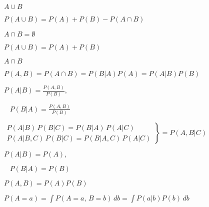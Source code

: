 \documentclass{article}
\def\lthtmlcheckvsize{\ifdim\ht\sizebox<\vsize 
  \ifdim\wd\sizebox<\hsize\expandafter\hfill\fi \expandafter\vfill
  \else\expandafter\vss\fi}%
\begin{document}
{\newpage\clearpage
{}%
$ A\cup B$%
\lthtmlindisplaymathZ
\lthtmlcheckvsize\clearpage}

{\newpage\clearpage
{}%
$\displaystyle P(A\cup B)=P(A)+P(B)-P(A\cap B)$%
\lthtmlindisplaymathZ
\lthtmlcheckvsize\clearpage}

{\newpage\clearpage
{}%
$\displaystyle A\cap B=\emptyset$%
\lthtmlindisplaymathZ
\lthtmlcheckvsize\clearpage}

{\newpage\clearpage
{}%
$\displaystyle P(A\cup B)=P(A)+P(B)$%
\lthtmlindisplaymathZ
\lthtmlcheckvsize\clearpage}

{\newpage\clearpage
{}%
$ A\cap B$%
\lthtmlindisplaymathZ
\lthtmlcheckvsize\clearpage}

{\newpage\clearpage
{}%
$\displaystyle P(A,B)=P(A\cap B)=P(B|A)P(A)=P(A|B)P(B)$%
\lthtmlindisplaymathZ
\lthtmlcheckvsize\clearpage}

{\newpage\clearpage
{}%
$\displaystyle P(A|B)=\frac{P(A, B)}{P(B)},\;\;\;$%
\lthtmlindisplaymathZ
\lthtmlcheckvsize\clearpage}

{\newpage\clearpage
{}%
$\displaystyle \;\;\;
P(B|A)=\frac{P(A, B)}{P(B)}$%
\lthtmlindisplaymathZ
\lthtmlcheckvsize\clearpage}

{\newpage\clearpage
{}%
$\displaystyle \left.\begin{array}{l}
P(A|B)\,P(B|C)=P(B|A)\,P(A|C)\\
P(A|B,C)\,P(B|C)=P(B|A,C)\,P(A|C)\end{array}\right\}=  P(A,B|C)$%
\lthtmlindisplaymathZ
\lthtmlcheckvsize\clearpage}

{\newpage\clearpage
{}%
$\displaystyle P(A|B)=P(A),\;\;\;$%
\lthtmlindisplaymathZ
\lthtmlcheckvsize\clearpage}

{\newpage\clearpage
{}%
$\displaystyle \;\;\;P(B|A)=P(B)$%
\lthtmlindisplaymathZ
\lthtmlcheckvsize\clearpage}

{\newpage\clearpage
{}%
$\displaystyle P(A, B)=P(A)P(B)$%
\lthtmlindisplaymathZ
\lthtmlcheckvsize\clearpage}

{\newpage\clearpage
{}%
$\displaystyle P(A=a)=\int P(A=a,\,B=b)\, db=\int P(a|b) P(b)\, db$%
\lthtmlindisplaymathZ
\lthtmlcheckvsize\clearpage}
\end{document}
